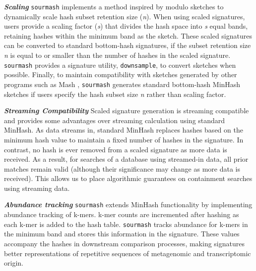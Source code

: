 \documentclass[10pt,a4paper,twocolumn]{article}
\begin{document}
\textit{\textbf{Scaling}} \lstinline{sourmash} implements a method inspired by modulo sketches \cite{broder1997resemblance} to dynamically scale hash subset retention size (\textit{n}). When using scaled signatures, users provide  a scaling factor (\textit{s}) that divides the hash space into \textit{s} equal bands, retaining hashes within the minimum band as the sketch. These scaled signatures can be converted to standard bottom-hash signatures, if the subset retention size \textit{n} is equal to or smaller than the number of hashes in the scaled signature. \lstinline{sourmash} provides a signature utility, \lstinline{downsample}, to convert sketches when possible. Finally, to maintain compatibility with sketches generated by other programs such as Mash \cite{ondov2016mash}, \lstinline{sourmash} generates standard bottom-hash MinHash sketches if users specify the hash subset size \textit{n} rather than scaling factor.





\textit{\textbf{Streaming Compatibility}} Scaled signature generation is streaming compatible and provides some advantages over streaming calculation using standard MinHash. As data streams in, standard MinHash replaces hashes based on the minimum hash value to maintain a fixed number of hashes in the signature. In contrast, no hash is ever removed from a scaled signature as more data is received. As a result, for searches of a database using streamed-in data, all prior matches remain valid (although their significance may change as more data is received). This allows us to place algorithmic guarantees on containment searches using streaming data.


\textit{\textbf{Abundance tracking}} \lstinline{sourmash} extends MinHash functionality by implementing abundance tracking of k-mers. k-mer counts are incremented after hashing as each k-mer is added to the hash table. \lstinline{sourmash} tracks abundance for k-mers in the minimum band and stores this information in the signature. These values accompany the hashes in downstream comparison processes, making signatures better representations of repetitive sequences of metagenomic and transcriptomic origin. 
\end{document}
